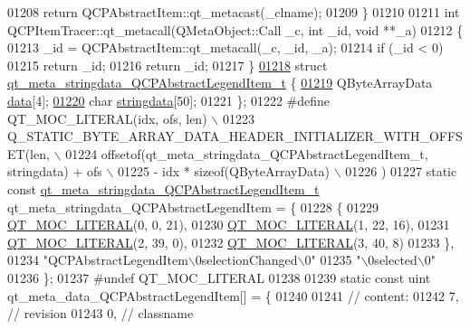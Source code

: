 \begin{DoxyCode}
01208     \textcolor{keywordflow}{return} QCPAbstractItem::qt\_metacast(\_clname);
01209 \}
01210 
01211 \textcolor{keywordtype}{int} QCPItemTracer::qt\_metacall(QMetaObject::Call \_c, \textcolor{keywordtype}{int} \_id, \textcolor{keywordtype}{void} **\_a)
01212 \{
01213     \_id = QCPAbstractItem::qt\_metacall(\_c, \_id, \_a);
01214     \textcolor{keywordflow}{if} (\_id < 0)
01215         \textcolor{keywordflow}{return} \_id;
01216     \textcolor{keywordflow}{return} \_id;
01217 \}
\hypertarget{a00016_source_l01218}{}\hyperlink{a00016}{01218} \textcolor{keyword}{struct }\hyperlink{a00016_d1/d44/a00098}{qt\_meta\_stringdata\_QCPAbstractLegendItem\_t} \{
\hypertarget{a00016_source_l01219}{}\hyperlink{a00016_a98fcd80c37c93a0b0b71f18405466d42}{01219}     QByteArrayData \hyperlink{a00016_a98fcd80c37c93a0b0b71f18405466d42}{data}[4];
\hypertarget{a00016_source_l01220}{}\hyperlink{a00016_a007f69edf60f3475c27481b80fb00e7f}{01220}     \textcolor{keywordtype}{char} \hyperlink{a00016_a007f69edf60f3475c27481b80fb00e7f}{stringdata}[50];
01221 \};
01222 \textcolor{preprocessor}{#define QT\_MOC\_LITERAL(idx, ofs, len) \(\backslash\)}
01223 \textcolor{preprocessor}{    Q\_STATIC\_BYTE\_ARRAY\_DATA\_HEADER\_INITIALIZER\_WITH\_OFFSET(len, \(\backslash\)}
01224 \textcolor{preprocessor}{    offsetof(qt\_meta\_stringdata\_QCPAbstractLegendItem\_t, stringdata) + ofs \(\backslash\)}
01225 \textcolor{preprocessor}{        - idx * sizeof(QByteArrayData) \(\backslash\)}
01226 \textcolor{preprocessor}{    )}
01227 \textcolor{keyword}{static} \textcolor{keyword}{const} \hyperlink{a00016_d1/d44/a00098}{qt\_meta\_stringdata\_QCPAbstractLegendItem\_t} 
      qt\_meta\_stringdata\_QCPAbstractLegendItem = \{
01228     \{
01229 \hyperlink{a00016_a75bb9482d242cde0a06c9dbdc6b83abe}{QT\_MOC\_LITERAL}(0, 0, 21),
01230 \hyperlink{a00016_a75bb9482d242cde0a06c9dbdc6b83abe}{QT\_MOC\_LITERAL}(1, 22, 16),
01231 \hyperlink{a00016_a75bb9482d242cde0a06c9dbdc6b83abe}{QT\_MOC\_LITERAL}(2, 39, 0),
01232 \hyperlink{a00016_a75bb9482d242cde0a06c9dbdc6b83abe}{QT\_MOC\_LITERAL}(3, 40, 8)
01233     \},
01234     \textcolor{stringliteral}{"QCPAbstractLegendItem\(\backslash\)0selectionChanged\(\backslash\)0"}
01235     \textcolor{stringliteral}{"\(\backslash\)0selected\(\backslash\)0"}
01236 \};
01237 \textcolor{preprocessor}{#undef QT\_MOC\_LITERAL}
01238 
01239 \textcolor{keyword}{static} \textcolor{keyword}{const} uint qt\_meta\_data\_QCPAbstractLegendItem[] = \{
01240 
01241  \textcolor{comment}{// content:}
01242        7,       \textcolor{comment}{// revision}
01243        0,       \textcolor{comment}{// classname}

\end{DoxyCode}

